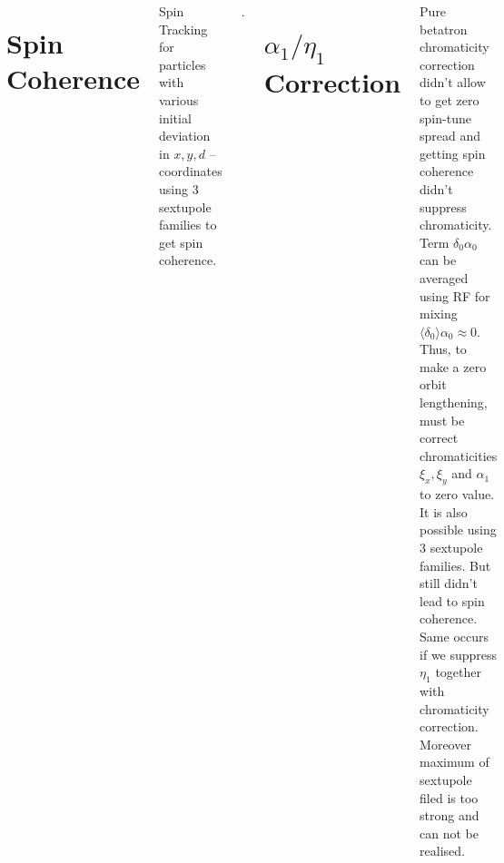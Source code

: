 \documentclass[25pt, a0paper, portrait, blockverticalspace=.5cm]{tikzposter}
\begin{document}
\begin{columns}
{\begin{minipage}{0.3\linewidth}
			\section*{Spin Coherence}
			\par Spin Tracking for particles with various initial deviation in $x, y, d$ – 
			coordinates using 3 sextupole families to get spin coherence.
		\end{minipage}
		\begin{minipage}{0.05\linewidth}
		\par  $.$
		\end{minipage}
		\begin{minipage}{0.3\linewidth}
			\section*{$\alpha_{1}/\eta_{1}$ Correction}
			\par Pure betatron chromaticity correction didn't allow to get zero 
			spin-tune spread and getting spin coherence didn't suppress chromaticity.
			Term $\delta_{0} \alpha_{0}$ can be averaged using RF for mixing $	\langle\delta_{0}\rangle \alpha_{0} \approx 0$. Thus, to make a zero orbit lengthening, must be correct chromaticities $\xi_x, \xi_{y}$ and $\alpha_{1}$ to zero value. It is also possible using 3 sextupole families. But still didn't lead to spin coherence. Same occurs if we suppress $\eta_{1}$ together with chromaticity correction. Moreover maximum of sextupole filed is too strong and can not be realised.
		\end{minipage}
		\newline
		\newline
}


\end{columns}
\end{document}
